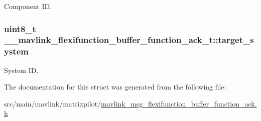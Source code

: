 Component I\+D. 

\hypertarget{struct____mavlink__flexifunction__buffer__function__ack__t_a272d1c2992e29ebbc3281bf98ceeb99d}{
\subsubsection[{target\+\_\+system}]{\setlength{\rightskip}{0pt plus 5cm}uint8\+\_\+t \+\_\+\+\_\+mavlink\+\_\+flexifunction\+\_\+buffer\+\_\+function\+\_\+ack\+\_\+t\+::target\+\_\+system}}\label{struct____mavlink__flexifunction__buffer__function__ack__t_a272d1c2992e29ebbc3281bf98ceeb99d}


System I\+D. 



The documentation for this struct was generated from the following file\+:\begin{DoxyCompactItemize}
\item 
src/main/mavlink/matrixpilot/\hyperlink{mavlink__msg__flexifunction__buffer__function__ack_8h}{mavlink\+\_\+msg\+\_\+flexifunction\+\_\+buffer\+\_\+function\+\_\+ack.\+h}\end{DoxyCompactItemize}
